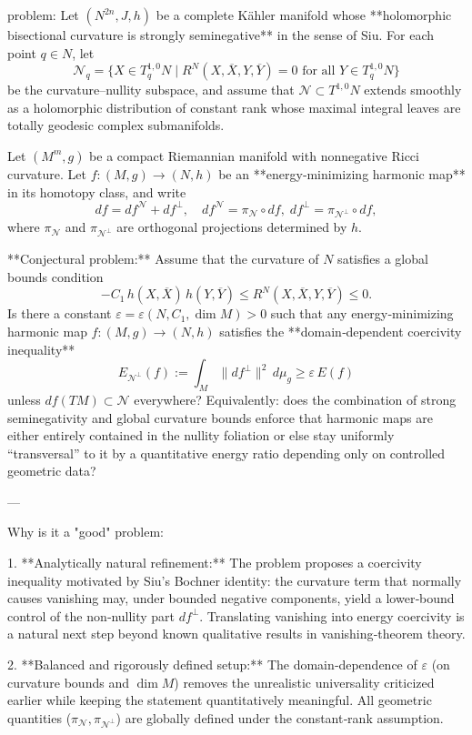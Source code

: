 problem:  
Let \((N^{2n},J,h)\) be a complete Kähler manifold whose **holomorphic bisectional curvature is strongly seminegative** in the sense of Siu.  
For each point \(q\in N\), let
\[
\mathcal{N}_q=\{X\in T^{1,0}_qN\mid R^N(X,\overline{X},Y,\overline{Y})=0 \text{ for all }Y\in T_q^{1,0}N\}
\]
be the curvature–nullity subspace, and assume that \(\mathcal{N}\subset T^{1,0}N\) extends smoothly as a holomorphic distribution of constant rank whose maximal integral leaves are totally geodesic complex submanifolds.

Let \((M^m,g)\) be a compact Riemannian manifold with nonnegative Ricci curvature.  
Let \(f:(M,g)\to (N,h)\) be an **energy‑minimizing harmonic map** in its homotopy class, and write
\[
df = df^{\mathcal N} + df^{\perp},
\quad df^{\mathcal N}=\pi_{\mathcal N}\circ df,\;
df^{\perp}=\pi_{\mathcal N^\perp}\circ df,
\]
where \(\pi_{\mathcal N}\) and \(\pi_{\mathcal N^\perp}\) are orthogonal projections determined by \(h\).

**Conjectural problem:**  
Assume that the curvature of \(N\) satisfies a global bounds condition
\[
-C_1\,h(X,\overline{X})\,h(Y,\overline{Y})\le R^N(X,\overline{X},Y,\overline{Y})\le 0.
\]
Is there a constant \(\varepsilon=\varepsilon(N,C_1,\dim M)>0\) such that any energy‑minimizing harmonic map \(f:(M,g)\to(N,h)\) satisfies the **domain‑dependent coercivity inequality**
\[
E_{\mathcal N^\perp}(f)
:=\int_M \|df^{\perp}\|^2\,d\mu_g
\ge \varepsilon\,E(f)
\]
unless \(df(TM)\subset\mathcal N\) everywhere?  
Equivalently: does the combination of strong seminegativity and global curvature bounds enforce that harmonic maps are either entirely contained in the nullity foliation or else stay uniformly “transversal” to it by a quantitative energy ratio depending only on controlled geometric data?

---

Why is it a "good" problem:

1. **Analytically natural refinement:**  
   The problem proposes a coercivity inequality motivated by Siu’s Bochner identity: the curvature term that normally causes vanishing may, under bounded negative components, yield a lower‑bound control of the non‑nullity part \(df^{\perp}\).  Translating vanishing into energy coercivity is a natural next step beyond known qualitative results in vanishing‑theorem theory.

2. **Balanced and rigorously defined setup:**  
   The domain‑dependence of \(\varepsilon\) (on curvature bounds and \(\dim M\)) removes the unrealistic universality criticized earlier while keeping the statement quantitatively meaningful.  All geometric quantities (\(\pi_{\mathcal N},\pi_{\mathcal N^\perp}\)) are globally defined under the constant‑rank assumption.

